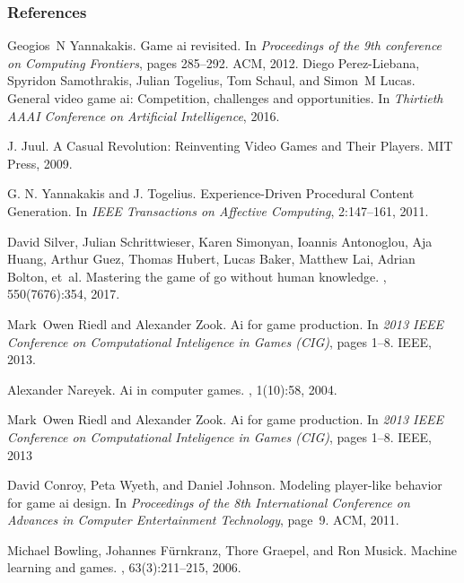 \documentclass{beamer}
\begin{document}
\begin{frame}[allowframebreaks]
\frametitle{References}
\footnotesize{
\begin{thebibliography}{0} %

Geogios~N Yannakakis.
\newblock Game ai revisited.
\newblock In {\em Proceedings of the 9th conference on Computing Frontiers},
  pages 285--292. ACM, 2012.
Diego Perez-Liebana, Spyridon Samothrakis, Julian Togelius, Tom Schaul, and
  Simon~M Lucas.
\newblock General video game ai: Competition, challenges and opportunities.
\newblock In {\em Thirtieth AAAI Conference on Artificial Intelligence}, 2016.

J. Juul.
\newblock A Casual Revolution: Reinventing Video Games and Their Players.
\newblock MIT Press, 2009.

G. N. Yannakakis and J. Togelius.
\newblock Experience-Driven Procedural Content Generation.
\newblock In {\em IEEE Transactions on Affective Computing}, 2:147–161, 2011.

  David Silver, Julian Schrittwieser, Karen Simonyan, Ioannis Antonoglou, Aja
    Huang, Arthur Guez, Thomas Hubert, Lucas Baker, Matthew Lai, Adrian Bolton,
    et~al.
  \newblock Mastering the game of go without human knowledge.
  , 550(7676):354, 2017.
  
Mark~Owen Riedl and Alexander Zook.
\newblock Ai for game production.
\newblock In {\em 2013 IEEE Conference on Computational Inteligence in Games
  (CIG)}, pages 1--8. IEEE, 2013.
  
Alexander Nareyek.
\newblock Ai in computer games.
, 1(10):58, 2004.
  
Mark~Owen Riedl and Alexander Zook.
\newblock Ai for game production.
\newblock In {\em 2013 IEEE Conference on Computational Inteligence in Games
  (CIG)}, pages 1--8. IEEE, 2013

David Conroy, Peta Wyeth, and Daniel Johnson.
\newblock Modeling player-like behavior for game ai design.
\newblock In {\em Proceedings of the 8th International Conference on Advances
  in Computer Entertainment Technology}, page~9. ACM, 2011.

Michael Bowling, Johannes F{\"u}rnkranz, Thore Graepel, and Ron Musick.
\newblock Machine learning and games.
, 63(3):211--215, 2006.



\end{thebibliography}}
\end{frame}
\end{document}
